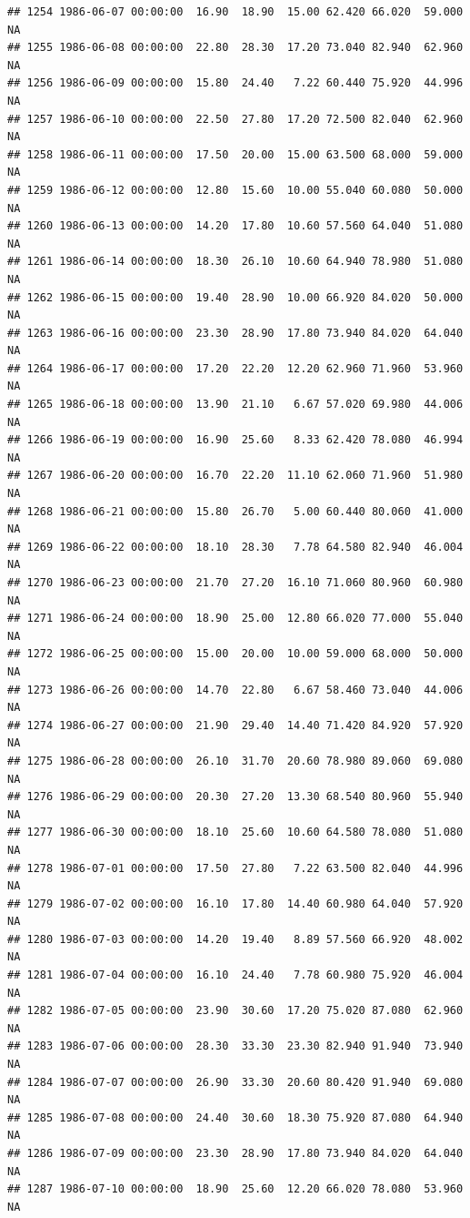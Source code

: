 \documentclass{article}\usepackage{graphicx, color}
\makeatletter
\newenvironment{kframe}{%
 \def\at@end@of@kframe{}%
 \ifinner\ifhmode%
  \def\at@end@of@kframe{\end{minipage}}%
  \begin{minipage}{\columnwidth}%
 \fi\fi%
 \def\FrameCommand##1{\hskip\@totalleftmargin \hskip-\fboxsep
 \colorbox{shadecolor}{##1}\hskip-\fboxsep
     \hskip-\linewidth \hskip-\@totalleftmargin \hskip\columnwidth}%
 \MakeFramed {\advance\hsize-\width
   \@totalleftmargin\z@ \linewidth\hsize
   \@setminipage}}%
 {\par\unskip\endMakeFramed%
 \at@end@of@kframe}
\newenvironment{knitrout}{}{} %
\makeatother
\begin{document}
\begin{knitrout}
\begin{kframe}
\begin{verbatim}
## 1254 1986-06-07 00:00:00  16.90  18.90  15.00 62.420 66.020  59.000     NA
## 1255 1986-06-08 00:00:00  22.80  28.30  17.20 73.040 82.940  62.960     NA
## 1256 1986-06-09 00:00:00  15.80  24.40   7.22 60.440 75.920  44.996     NA
## 1257 1986-06-10 00:00:00  22.50  27.80  17.20 72.500 82.040  62.960     NA
## 1258 1986-06-11 00:00:00  17.50  20.00  15.00 63.500 68.000  59.000     NA
## 1259 1986-06-12 00:00:00  12.80  15.60  10.00 55.040 60.080  50.000     NA
## 1260 1986-06-13 00:00:00  14.20  17.80  10.60 57.560 64.040  51.080     NA
## 1261 1986-06-14 00:00:00  18.30  26.10  10.60 64.940 78.980  51.080     NA
## 1262 1986-06-15 00:00:00  19.40  28.90  10.00 66.920 84.020  50.000     NA
## 1263 1986-06-16 00:00:00  23.30  28.90  17.80 73.940 84.020  64.040     NA
## 1264 1986-06-17 00:00:00  17.20  22.20  12.20 62.960 71.960  53.960     NA
## 1265 1986-06-18 00:00:00  13.90  21.10   6.67 57.020 69.980  44.006     NA
## 1266 1986-06-19 00:00:00  16.90  25.60   8.33 62.420 78.080  46.994     NA
## 1267 1986-06-20 00:00:00  16.70  22.20  11.10 62.060 71.960  51.980     NA
## 1268 1986-06-21 00:00:00  15.80  26.70   5.00 60.440 80.060  41.000     NA
## 1269 1986-06-22 00:00:00  18.10  28.30   7.78 64.580 82.940  46.004     NA
## 1270 1986-06-23 00:00:00  21.70  27.20  16.10 71.060 80.960  60.980     NA
## 1271 1986-06-24 00:00:00  18.90  25.00  12.80 66.020 77.000  55.040     NA
## 1272 1986-06-25 00:00:00  15.00  20.00  10.00 59.000 68.000  50.000     NA
## 1273 1986-06-26 00:00:00  14.70  22.80   6.67 58.460 73.040  44.006     NA
## 1274 1986-06-27 00:00:00  21.90  29.40  14.40 71.420 84.920  57.920     NA
## 1275 1986-06-28 00:00:00  26.10  31.70  20.60 78.980 89.060  69.080     NA
## 1276 1986-06-29 00:00:00  20.30  27.20  13.30 68.540 80.960  55.940     NA
## 1277 1986-06-30 00:00:00  18.10  25.60  10.60 64.580 78.080  51.080     NA
## 1278 1986-07-01 00:00:00  17.50  27.80   7.22 63.500 82.040  44.996     NA
## 1279 1986-07-02 00:00:00  16.10  17.80  14.40 60.980 64.040  57.920     NA
## 1280 1986-07-03 00:00:00  14.20  19.40   8.89 57.560 66.920  48.002     NA
## 1281 1986-07-04 00:00:00  16.10  24.40   7.78 60.980 75.920  46.004     NA
## 1282 1986-07-05 00:00:00  23.90  30.60  17.20 75.020 87.080  62.960     NA
## 1283 1986-07-06 00:00:00  28.30  33.30  23.30 82.940 91.940  73.940     NA
## 1284 1986-07-07 00:00:00  26.90  33.30  20.60 80.420 91.940  69.080     NA
## 1285 1986-07-08 00:00:00  24.40  30.60  18.30 75.920 87.080  64.940     NA
## 1286 1986-07-09 00:00:00  23.30  28.90  17.80 73.940 84.020  64.040     NA
## 1287 1986-07-10 00:00:00  18.90  25.60  12.20 66.020 78.080  53.960     NA

\end{verbatim}
\end{kframe}
\end{knitrout}
\end{document}
